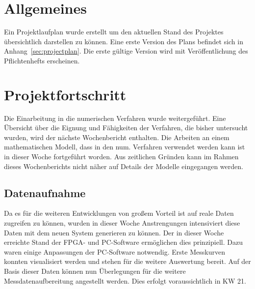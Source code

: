 \documentclass[a4paper,12pt,fleqn]{article}
\begin{document}
\setlength{\headheight}{36pt}

\begin{titlepage}



\end{titlepage}

\section[Allgemeines]{Allgemeines}
Ein Projektlaufplan wurde erstellt um den aktuellen Stand des Projektes übersichtlich darstellen zu können. Eine erste Version des Plans befindet sich in Anhang~\ref{sec:projectplan}. Die erste gültige Version wird mit Veröffentlichung des Pflichtenhefts erscheinen.

\section[Fortschritt]{Projektfortschritt}
Die Einarbeitung in die numerischen Verfahren wurde weitergeführt. Eine Übersicht über die Eignung und Fähigkeiten der Verfahren, die bisher untersucht wurden, wird der nächste Wochenbericht enthalten. Die Arbeiten an einem mathematischen Modell, dass in den num. Verfahren verwendet werden kann ist in dieser Woche fortgeführt worden. Aus zeitlichen Gründen kann im Rahmen dieses Wochenberichts nicht näher auf Details der Modelle eingegangen werden.

\subsection{Datenaufnahme}
Da es für die weiteren Entwicklungen von großem Vorteil ist auf reale Daten zugreifen zu können, wurden in dieser Woche Anstrengungen intensiviert diese Daten mit dem neuen System generieren zu können. Der in dieser Woche erreichte Stand der FPGA- und PC-Software ermöglichen dies prinzipiell. Dazu waren einige Anpassungen der PC-Software notwendig. Erste Messkurven konnten visualisiert werden und stehen für die weitere Auswertung bereit. Auf der Basis dieser Daten können nun Überlegungen für die weitere Messdatenaufbereitung angestellt werden. Dies erfolgt voraussichtlich in KW 21.

\end{document}
